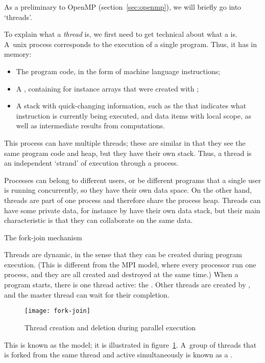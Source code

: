 
As a preliminary to OpenMP (section~\ref{sec:openmp}), we will briefly
go into `threads'.

To explain what a \emph{thread} is, we first need to get
technical about what a  is.
A~unix process corresponds to the execution of a single program.
Thus, it has in memory:
\begin{itemize}
\item The program code, in the form of machine language instructions;
\item A , containing for instance arrays that were
  created with ;
\item A stack with quick-changing information, such as the
   that indicates what instruction is
  currently being executed, and data items with local scope, as well
  as intermediate results from computations.
\end{itemize}
This process can have multiple threads; these are similar
in that they see the same program code and heap, 
but they have their own stack. Thus, a thread is an independent
`strand' of execution through a process.

Processes can belong to different users, or be different
programs that a single user is running concurrently, so they
have their own data space.
On the other hand, threads are part of one process and
therefore share the process heap.
Threads can have some
private data, for instance by have their own data stack, but
their main characteristic is that they can collaborate on the same
data. 

 {The fork-join mechanism}

Threads are dynamic, in the sense that they can be created during program 
execution. (This is different from the MPI model, where every processor
run one process, and they are all created and destroyed at the same time.)
When a program starts, there is one thread active: the .
Other threads are created by , and
the master thread can wait for their completion.
\begin{figure}[ht]
\texttt{[image: fork-join]}
\caption{Thread creation and deletion during parallel execution}
\label{fig:forkjoin}
\end{figure}
This is known as the  model; it is illustrated
in figure~\ref{fig:forkjoin}. A~group of threads that is 
forked from the same thread and active simultaneously is known
as a .

